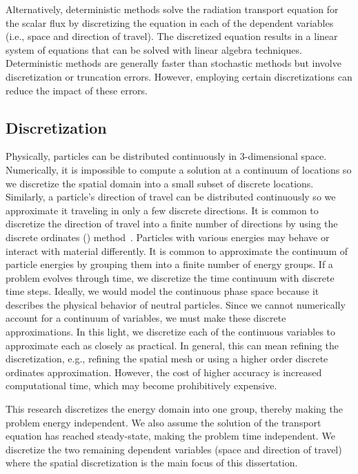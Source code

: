 \documentclass{article}
\begin{document}
Alternatively, deterministic methods solve the radiation transport equation for the scalar flux by discretizing the equation in each of the dependent variables (i.e., space and direction of travel). The discretized equation results in a linear system of equations that can be solved with linear algebra techniques. Deterministic methods are generally faster than stochastic methods but involve discretization or truncation errors. However, employing certain discretizations can reduce the impact of these errors.

\subsection{Discretization}
\label{sec:DiscretizationIntro}

Physically, particles can be distributed continuously in 3-dimensional space. Numerically, it is impossible to compute a solution at a continuum of locations so we discretize the spatial domain into a small subset of discrete locations. Similarly, a particle's direction of travel can be distributed continuously so we approximate it traveling in only a few discrete directions. It is common to discretize the direction of travel into a finite number of directions by using the discrete ordinates (\SN) method~\cite{discrete_ordinates}. Particles with various energies may behave or interact with material differently. It is common to approximate the continuum of particle energies by grouping them into a finite number of energy groups. If a problem evolves through time, we discretize the time continuum with discrete time steps. Ideally, we would model the continuous phase space because it describes the physical behavior of neutral particles. Since we cannot numerically account for a continuum of variables, we must make these discrete approximations. In this light, we discretize each of the continuous variables to approximate each as closely as practical. In general, this can mean refining the discretization, e.g., refining the spatial mesh or using a higher order discrete ordinates approximation. However, the cost of higher accuracy is increased computational time, which may become prohibitively expensive.

This research discretizes the energy domain into one group, thereby making the problem energy independent. We also assume the solution of the transport equation has reached steady-state, making the problem time independent. We discretize the two remaining dependent variables (space and direction of travel) where the spatial discretization is the main focus of this dissertation.
\end{document}
